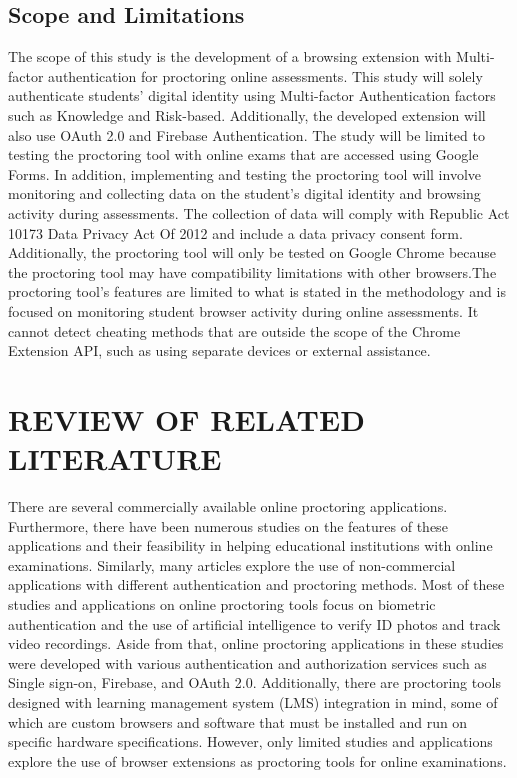\documentclass{icsthesis}
\begin{document}
\begin{mainmatter}
\subsection{Scope and Limitations}
The scope of this study is the development of a browsing extension with Multi-factor authentication for proctoring online assessments. This study will solely authenticate students' digital identity using Multi-factor Authentication factors such as Knowledge and Risk-based. Additionally, the developed extension will also use OAuth 2.0 and Firebase Authentication. The study will be limited to testing the proctoring tool with online exams that are accessed using Google Forms. In addition, implementing and testing the proctoring tool will involve monitoring and collecting data on the student's digital identity and browsing activity during assessments. The collection of data will comply with Republic Act 10173 Data Privacy Act Of 2012 and include a data privacy consent form. Additionally, the proctoring tool will only be tested on Google Chrome because the proctoring tool may have compatibility limitations with other browsers.The proctoring tool’s features are limited to what is stated in the methodology and is focused on monitoring student browser activity during online assessments. It cannot detect cheating methods that are outside the scope of the Chrome Extension API, such as using separate devices or external assistance.

\section{REVIEW OF RELATED LITERATURE}
There are several commercially available online proctoring applications. Furthermore, there have been numerous studies on the features of these applications and their feasibility in helping educational institutions with online examinations. Similarly, many articles explore the use of non-commercial applications with different authentication and proctoring methods. Most of these studies and applications on online proctoring tools focus on biometric authentication and the use of artificial intelligence to verify ID photos and track video recordings. Aside from that, online proctoring applications in these studies were developed with various authentication and authorization services such as Single sign-on, Firebase, and OAuth 2.0. Additionally, there are proctoring tools designed with learning management system (LMS) integration in mind, some of which are custom browsers and software that must be installed and run on specific hardware specifications. However, only limited studies and applications explore the use of browser extensions as proctoring tools for online examinations.

\end{mainmatter}
\end{document}
